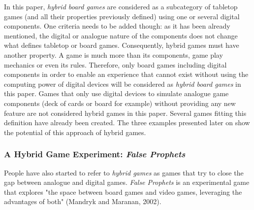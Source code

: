 In this paper, \textit{hybrid board games} are considered as a subcategory of tabletop games (and all their properties previously defined) using one or several digital components. One criteria needs to be added though: as it has been already mentioned, the digital or analogue nature of the components does not change what defines tabletop or board games. Consequently, hybrid games must have another property. A game is much more than its components, game play mechanics or even its rules. Therefore, only board games including digital components in order to enable an experience that cannot exist without using the computing power of digital devices will be considered as \textit{hybrid board games} in this paper. Games that only use digital devices to simulate analogue game components (deck of cards or board for example) without providing any new feature are not considered hybrid games in this paper. Several games fitting this definition have already been created. The three examples presented later on show the potential of this approach of hybrid games.

\subsubsection{A Hybrid Game Experiment: \textit{False Prophets}}
People have also started to refer to \textit{hybrid games} as games that try to close the gap between analogue and digital games. \textit{False Prophets} is an experimental game that explores "the space between board games and video games, leveraging the advantages of both" (Mandryk and Maranan, 2002)\cite{art:prophets}. 


